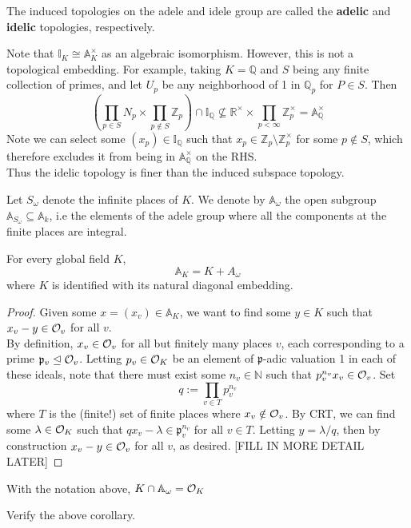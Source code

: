 \documentclass[11pt, x11names]{article}
\newcommand{\nn}{\mathbb{N}}
\newcommand{\zz}{\mathbb{Z}}
\newcommand{\qq}{\mathbb{Q}}
\newcommand{\rr}{\mathbb{R}}
\renewcommand{\aa}{\mathbb{A}}
\newcommand{\ii}{\mathbb{I}}
\newcommand{\pp}{\mathfrak{p}}
\renewcommand{\brack}[1]{\left(   #1 \right)}
\newcommand{\ideal}{\trianglelefteq}
\begin{document}
The induced topologies on the adele and idele group are called the \textbf{adelic} and \textbf{idelic} topologies, respectively.

\begin{remark}
Note that $\ii_K \cong \aa_K^\times$ as an algebraic isomorphism. However, this is not a topological embedding. For example, taking $K = \qq$ and $S$ being any finite collection of primes, and let $U_p$ be any neighborhood of 1 in $\qq_p$ for $P \in S$. Then
\begin{equation*}
    \brack{\prod_{p \in S}N_p \times \prod_{p \notin S}\zz_p} \cap \ii_\qq \nsubseteq \rr^\times \times \prod_{p < \infty} \zz_p^\times = \aa_\qq^\times 
\end{equation*}
Note we can select some $(x_p) \in \ii_\qq$ such that $x_p \in \zz_p \setminus \zz_p^\times$ for some $p \notin S$, which therefore excludes it from being in $\aa_\qq^\times$ on the RHS.\\
Thus the idelic topology is finer than the induced subspace topology.
\end{remark}

Let $S_\omega$ denote the infinite places of $K$. We denote by $\aa_\omega$ the open subgroup $\aa_{S_\omega} \subseteq \aa_k$, i.e the elements of the adele group where all the components at the finite places are integral.

\begin{theorem}[Approximation]
\label{Approximation Theorem}
For every global field $K$,
\begin{equation*}
    \aa_K = K + A_\omega
\end{equation*}
where $K$ is identified with its natural diagonal embedding.
\end{theorem}
\begin{proof}
Given some $x = (x_v) \in \aa_K$, we want to find some $y \in K$ such that $x_v - y \in \mathcal{O}_v$ for all $v$.\\
By definition, $x_v \in \mathcal{O}_v$ for all but finitely many places $v$, each corresponding to a prime $\pp_v \ideal \calo_v$. Letting $p_v \in \mathcal{O}_K$ be an element of $\pp$-adic valuation 1 in each of these ideals, note that there must exist some $n_v \in \nn$ such that $p_v^{n_v}x_v \in \mathcal{O}_v$. Set 
\begin{equation*}
    q := \prod_{v \in T} p_v^{n_v} 
\end{equation*}
where $T$ is the (finite!) set of finite places where $x_v \notin \mathcal{O}_v$. By CRT, we can find some $\lambda \in \mathcal{O}_K$ such that $qx_v - \lambda \in \pp_v^{n_v}$ for all $v \in T$. Letting $y = \lambda/q$, then by construction $x_v - y \in \mathcal{O}_v$ for all $v$, as desired. [FILL IN MORE DETAIL LATER]
\end{proof}
\begin{corollary}
    With the notation above, $K \cap \aa_\omega = \calo_K$
\end{corollary}
\begin{sanitycheck}
    Verify the above corollary.
\end{sanitycheck}
\end{document}
